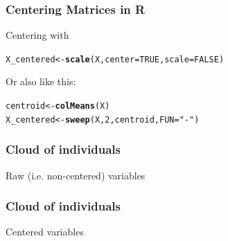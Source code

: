 \documentclass[12pt]{beamer}\usepackage[]{graphicx}\usepackage[]{color}
\makeatletter
\newcommand{\hlnum}[1]{\textcolor[rgb]{0.686,0.059,0.569}{#1}}%
\newcommand{\hlstr}[1]{\textcolor[rgb]{0.192,0.494,0.8}{#1}}%
\newcommand{\hlstd}[1]{\textcolor[rgb]{0.345,0.345,0.345}{#1}}%
\newcommand{\hlkwb}[1]{\textcolor[rgb]{0.69,0.353,0.396}{#1}}%
\newcommand{\hlkwc}[1]{\textcolor[rgb]{0.333,0.667,0.333}{#1}}%
\newcommand{\hlkwd}[1]{\textcolor[rgb]{0.737,0.353,0.396}{\textbf{#1}}}%
\newenvironment{kframe}{%
 \def\at@end@of@kframe{}%
 \ifinner\ifhmode%
  \def\at@end@of@kframe{\end{minipage}}%
  \begin{minipage}{\columnwidth}%
 \fi\fi%
 \def\FrameCommand##1{\hskip\@totalleftmargin \hskip-\fboxsep
 \colorbox{shadecolor}{##1}\hskip-\fboxsep
     \hskip-\linewidth \hskip-\@totalleftmargin \hskip\columnwidth}%
 \MakeFramed {\advance\hsize-\width
   \@totalleftmargin\z@ \linewidth\hsize
   \@setminipage}}%
 {\par\unskip\endMakeFramed%
 \at@end@of@kframe}
\newenvironment{knitrout}{}{} %
\makeatother
\begin{document}

\begin{frame}[fragile]
\frametitle{Centering Matrices in R}

Centering with 

\begin{knitrout}\footnotesize
{}\color{fgcolor}\begin{kframe}
\begin{alltt}
\hlstd{X_centered} \hlkwb{<-} \hlkwd{scale}\hlstd{(X,} \hlkwc{center} \hlstd{=} \hlnum{TRUE}\hlstd{,} \hlkwc{scale} \hlstd{=} \hlnum{FALSE}\hlstd{)}
\end{alltt}
\end{kframe}
\end{knitrout}

Or also like this:
\begin{knitrout}\footnotesize
{}\color{fgcolor}\begin{kframe}
\begin{alltt}
\hlstd{centroid} \hlkwb{<-} \hlkwd{colMeans}\hlstd{(X)}
\hlstd{X_centered} \hlkwb{<-} \hlkwd{sweep}\hlstd{(X,} \hlnum{2}\hlstd{, centroid,} \hlkwc{FUN} \hlstd{=} \hlstr{"-"}\hlstd{)}
\end{alltt}
\end{kframe}
\end{knitrout}

\end{frame}


\begin{frame}
\frametitle{Cloud of individuals}
\begin{center}

{\lolit Raw (i.e. non-centered) variables}
\end{center}
\end{frame}


\begin{frame}
\frametitle{Cloud of individuals}
\begin{center}

{\lolit Centered variables}
\end{center}
\end{frame}
\end{document}
